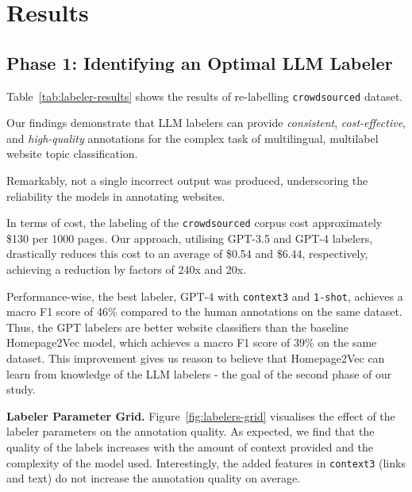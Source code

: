 \section{Results}

\subsection*{Phase 1: Identifying an Optimal LLM Labeler}

Table~\ref{tab:labeler-results} shows the results of re-labelling \texttt{crowdsourced} dataset.

Our findings demonstrate that LLM labelers can provide \textit{consistent}, \textit{cost-effective}, and \textit{high-quality} annotations for the complex task of multilingual, multilabel website topic classification. 

Remarkably, not a single incorrect output was produced, underscoring the reliability the models in annotating websites.

In terms of cost, the labeling of the \texttt{crowdsourced} corpus cost approximately \$130 per 1000 pages. Our approach, utilising GPT-3.5 and GPT-4 labelers, drastically reduces this cost to an average of \$0.54 and \$6.44, respectively, achieving a reduction by factors of 240x and 20x.





Performance-wise, the best labeler, GPT-4 with \texttt{context3} and \texttt{1-shot}, achieves a macro F1 score of 46\% compared to the human annotations on the same dataset. Thus, the GPT labelers are better website classifiers than the baseline Homepage2Vec model, which achieves a macro F1 score of 39\% on the same dataset. This improvement gives us reason to believe that Homepage2Vec can learn from knowledge of the LLM labelers - the goal of the second phase of our study.



\textbf{Labeler Parameter Grid.} Figure~\ref{fig:labelers-grid} visualises the effect of the labeler parameters on the annotation quality. As expected, we find that the quality of the labels increases with the amount of context provided and the complexity of the model used. Interestingly, the added features in \texttt{context3} (links and text) do not increase the annotation quality on average.

